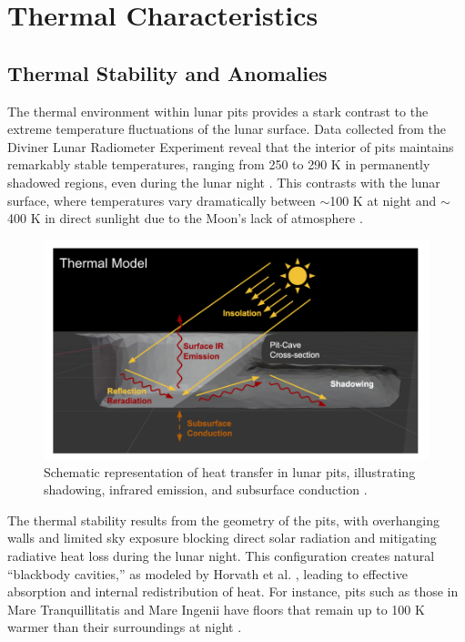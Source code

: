 \graphicspath{{img/ch3}}

\section{Thermal Characteristics}

\subsection{Thermal Stability and Anomalies}

The thermal environment within lunar pits provides a stark contrast to the extreme temperature fluctuations of the lunar surface. Data collected from the Diviner Lunar Radiometer Experiment reveal that the interior of pits maintains remarkably stable temperatures, ranging from 250 to 290 K in permanently shadowed regions, even during the lunar night \cite{thermal-lunar-pits}. This contrasts with the lunar surface, where temperatures vary dramatically between $\sim$100 K at night and $\sim$400 K in direct sunlight due to the Moon’s lack of atmosphere \cite{newer-thermal}.

\begin{figure}[H]
    \centering
    \includegraphics[width=0.6\linewidth]{lunar-pit-thermal-model.png}
    \caption{Schematic representation of heat transfer in lunar pits, illustrating shadowing, infrared emission, and subsurface conduction \cite{thermal-lunar-pits, newer-thermal}.}
    \label{fig:lunar-pit-thermal-model}
\end{figure}

The thermal stability results from the geometry of the pits, with overhanging walls and limited sky exposure blocking direct solar radiation and mitigating radiative heat loss during the lunar night. This configuration creates natural “blackbody cavities,” as modeled by Horvath et al. \cite{thermal-lunar-pits}, leading to effective absorption and internal redistribution of heat. For instance, pits such as those in Mare Tranquillitatis and Mare Ingenii have floors that remain up to 100 K warmer than their surroundings at night \cite{thermal-lunar-pits, newer-thermal, nesnas2019}.

